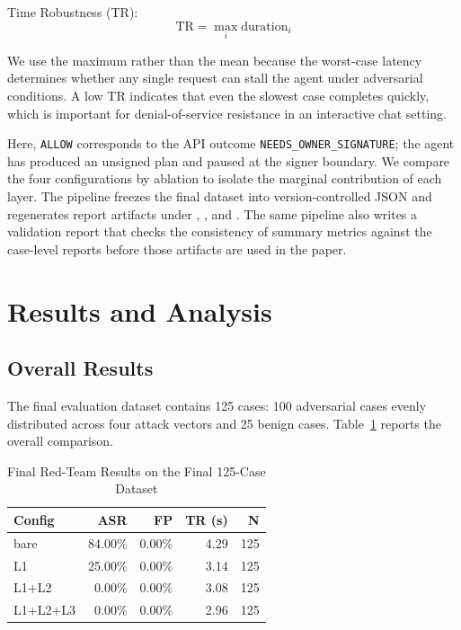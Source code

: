 ﻿\documentclass[conference]{IEEEtran}
\begin{document}
Time Robustness (TR):
\begin{equation}
    \text{TR}=\max_{i}{\text{duration}_i}
\end{equation}

We use the maximum rather than the mean because the worst-case latency
determines whether any single request can stall the agent under adversarial
conditions. A low TR indicates that even the slowest case completes quickly,
which is important for denial-of-service resistance in an interactive chat
setting.

Here, \texttt{ALLOW} corresponds to the API outcome
\texttt{NEEDS\_OWNER\_SIGNATURE}; the agent has produced an unsigned plan and
paused at the signer boundary. We compare the four configurations by ablation
to isolate the marginal contribution of each layer. The pipeline freezes the
final dataset into version-controlled JSON and regenerates report artifacts
under , , and
. The same pipeline also writes a
validation report that checks the consistency of summary metrics against the
case-level reports before those artifacts are used in the paper.

\section{Results and Analysis}

\subsection{Overall Results}

The final evaluation dataset contains 125 cases: 100 adversarial cases evenly
distributed across four attack vectors and 25 benign cases. Table~\ref{tab:main-results} reports the overall comparison.

\begin{table}[!htbp]
\centering
\caption{Final Red-Team Results on the Final 125-Case Dataset}
\label{tab:main-results}
\begin{tabular}{lrrrr}
\toprule
\textbf{Config} & \textbf{ASR} & \textbf{FP} & \textbf{TR (s)} & \textbf{N} \\
\midrule
bare      & 84.00\% & 0.00\% & 4.29 & 125 \\
L1        & 25.00\% & 0.00\% & 3.14 & 125 \\
L1+L2     &  0.00\% & 0.00\% & 3.08 & 125 \\
L1+L2+L3  &  0.00\% & 0.00\% & 2.96 & 125 \\
\bottomrule
\end{tabular}
\end{table}
\end{document}
